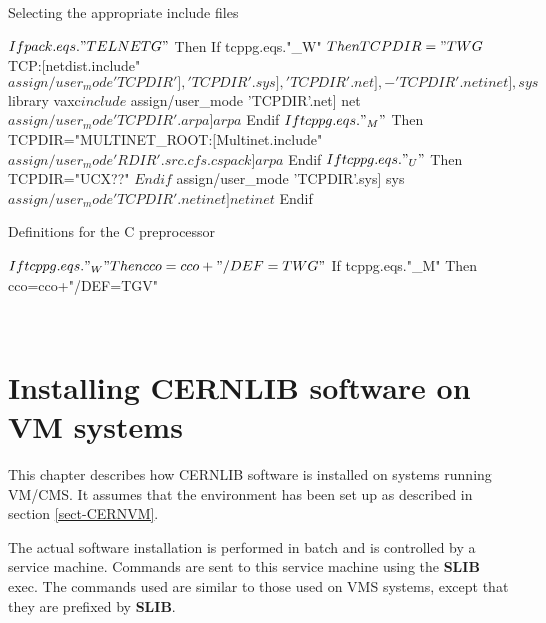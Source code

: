 \begin{XMPt}{Selecting the appropriate include files}

$ If pack.eqs."TELNETG"
$ Then If tcppg.eqs."_W"
$      Then TCPDIR="TWG$TCP:[netdist.include"
$           assign/user_mode 'TCPDIR'],'TCPDIR'.sys],'TCPDIR'.net],-
                             'TCPDIR'.netinet],sys$library vaxc$include
$           assign/user_mode 'TCPDIR'.net]     net
$           assign/user_mode 'TCPDIR'.arpa]    arpa
$      Endif
$      If tcppg.eqs."_M"
$      Then TCPDIR="MULTINET_ROOT:[Multinet.include"
$           assign/user_mode 'RDIR'.src.cfs.cspack] arpa
$      Endif
$      If tcppg.eqs."_U"
$      Then TCPDIR="UCX??"
$      Endif
$           assign/user_mode 'TCPDIR'.sys]     sys
$           assign/user_mode 'TCPDIR'.netinet] netinet
$ Endif

\end{XMPt}

\begin{XMPt}{Definitions for the C preprocessor}

$      If tcppg.eqs."_W"   Then cco=cco+"/DEF=TWG"
$      If tcppg.eqs."_M"   Then cco=cco+"/DEF=TGV"

\end{XMPt}


\

\chapter{Installing CERNLIB software on VM systems}

This chapter describes how CERNLIB software is installed on systems
running VM/CMS. It assumes that the environment has been set up
as described in section \ref{sect-CERNVM}.

The actual software installation is performed in batch and is
controlled by a service machine. Commands are sent to this
service machine using the {\bf SLIB} exec.
The commands used are similar to those used on VMS systems,
except that they are prefixed by {\bf SLIB}.

